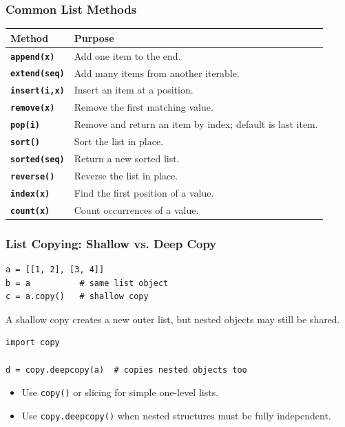 \documentclass[aspectratio=169,10pt]{beamer}
\newcommand{\code}[1]{\texttt{#1}}
\newenvironment{bluebox}[1]{%
  \vspace{0.08cm}\begin{tcolorbox}[lecturebox,title={#1},fontupper=\small]%
}{\end{tcolorbox}\vspace{0.05cm}}
\begin{document}
\begin{frame}
\frametitle{Common List Methods}
\small
\renewcommand{\arraystretch}{1.25}
\begin{tabularx}{\linewidth}{>{\bfseries}p{2.6cm}X}
\toprule
Method & Purpose \\
\midrule
\code{append(x)} & Add one item to the end. \\
\code{extend(seq)} & Add many items from another iterable. \\
\code{insert(i,x)} & Insert an item at a position. \\
\code{remove(x)} & Remove the first matching value. \\
\code{pop(i)} & Remove and return an item by index; default is last item. \\
\code{sort()} & Sort the list in place. \\
\code{sorted(seq)} & Return a new sorted list. \\
\code{reverse()} & Reverse the list in place. \\
\code{index(x)} & Find the first position of a value. \\
\code{count(x)} & Count occurrences of a value. \\
\bottomrule
\end{tabularx}
\end{frame}

\begin{frame}[fragile]
\frametitle{List Copying: Shallow vs. Deep Copy}
\begin{lstlisting}[style=py]
a = [[1, 2], [3, 4]]
b = a          # same list object
c = a.copy()   # shallow copy
\end{lstlisting}
\begin{bluebox}{Important distinction}
A shallow copy creates a new outer list, but nested objects may still be shared.
\end{bluebox}
\begin{lstlisting}[style=py]
import copy

d = copy.deepcopy(a)  # copies nested objects too
\end{lstlisting}
\begin{itemize}
  \item Use \code{copy()} or slicing for simple one-level lists.
  \item Use \code{copy.deepcopy()} when nested structures must be fully independent.
\end{itemize}
\end{frame}
\end{document}
